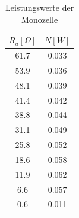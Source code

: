 \documentclass[11pt,ngerman,a4paper]{article}
\begin{document}
 \begin{table}
 \centering
 \begin{tabular}{|c|c|}
\hline
$R_a [\Omega]$ & $N [W]$ \\
\hline
61.7 & 0.033\\
53.9 & 0.036\\
48.1 & 0.039\\
41.4 & 0.042\\
38.8 & 0.044\\
31.1 & 0.049\\
25.8 & 0.052\\
18.6 & 0.058\\
11.9 & 0.062\\
6.6 & 0.057\\
0.6 & 0.011\\
\hline
\end{tabular}
\caption{Leistungswerte der Monozelle}
\label{leistung}
\end{table}
\end{document}
